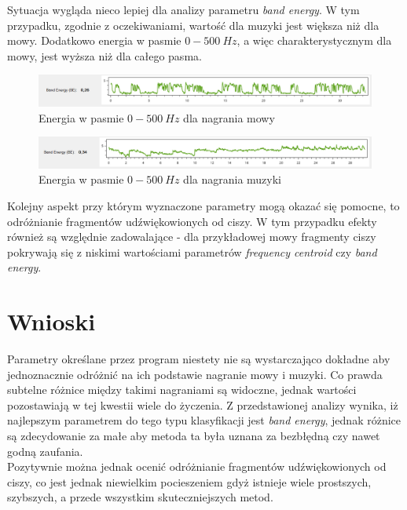 \documentclass[a4paper]{article}
\begin{document}
\noindent Sytuacja wygląda nieco lepiej dla analizy parametru \textit{band energy}. W tym przypadku, zgodnie z oczekiwaniami, wartość dla muzyki jest większa niż dla mowy. Dodatkowo energia w pasmie $0-500\:Hz$, a więc charakterystycznym dla mowy, jest wyższa niż dla całego pasma.
\begin{figure}[H]
  \includegraphics[width=\linewidth]{images/06speechEnergy.png}
  \caption{Energia w pasmie $0-500\:Hz$ dla nagrania mowy}
\end{figure}
\begin{figure}[H]
  \includegraphics[width=\linewidth]{images/07musicEnergy.png}
  \caption{Energia w pasmie $0-500\:Hz$ dla nagrania muzyki}
\end{figure}
\noindent Kolejny aspekt przy którym wyznaczone parametry mogą okazać się pomocne, to odróżnianie fragmentów udźwiękowionych od ciszy. W tym przypadku efekty również są względnie zadowalające - dla przykładowej mowy fragmenty ciszy pokrywają się z niskimi wartościami parametrów \textit{frequency centroid} czy \textit{band energy}.

\section{Wnioski}
Parametry określane przez program niestety nie są wystarczająco dokładne aby jednoznacznie odróżnić na ich podstawie nagranie mowy i muzyki. Co prawda subtelne różnice między takimi nagraniami są widoczne, jednak wartości pozostawiają w tej kwestii wiele do życzenia. Z przedstawionej analizy wynika, iż najlepszym parametrem do tego typu klasyfikacji jest \textit{band energy}, jednak różnice są zdecydowanie za małe aby metoda ta była uznana za bezbłędną czy nawet godną zaufania.\\
Pozytywnie można jednak ocenić odróżnianie fragmentów udźwiękowionych od ciszy, co jest jednak niewielkim pocieszeniem gdyż istnieje wiele prostszych, szybszych, a przede wszystkim skuteczniejszych metod.

\lstset{basicstyle=\ttfamily}
\lstset{style=sharpc}
\begin{lstlisting}
\end{lstlisting}
\end{document}
